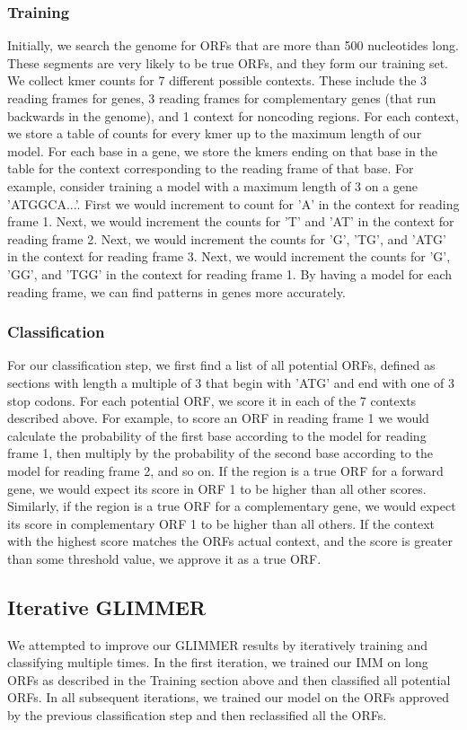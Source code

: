 \documentclass[11pt,letterpaper]{article}
\begin{document}
\subsubsection{Training}
Initially, we search the genome for ORFs that are more than 500 nucleotides long. These segments are very likely to be true ORFs, and they form our training set. We collect kmer counts for 7 different possible contexts. These include the 3 reading frames for genes, 3 reading frames for complementary genes (that run backwards in the genome), and 1 context for noncoding regions. For each context, we store a table of counts for every kmer up to the maximum length of our model. For each base in a gene, we store the kmers ending on that base in the table for the context corresponding to the reading frame of that base. For example, consider training a model with a maximum length of 3 on a gene 'ATGGCA...'. First we would increment to count for 'A' in the context for reading frame 1. Next, we would increment the counts for 'T' and 'AT' in the context for reading frame 2. Next, we would increment the counts for 'G', 'TG', and 'ATG' in the context for reading frame 3. Next, we would increment the counts for 'G', 'GG', and 'TGG' in the context for reading frame 1. By having a model for each reading frame, we can find patterns in genes more accurately.

\subsubsection{Classification}
For our classification step, we first find a list of all potential ORFs, defined as sections with length a multiple of 3 that begin with 'ATG' and end with one of 3 stop codons. For each potential ORF, we score it in each of the 7 contexts described above. For example, to score an ORF in reading frame 1 we would calculate the probability of the first base according to the model for reading frame 1, then multiply by the probability of the second base according to the model for reading frame 2, and so on. If the region is a true ORF for a forward gene, we would expect its score in ORF 1 to be higher than all other scores. Similarly, if the region is a true ORF for a complementary gene, we would expect its score in complementary ORF 1 to be higher than all others. If the context with the highest score matches the ORFs actual context, and the score is greater than some threshold value, we approve it as a true ORF.


\subsection{Iterative GLIMMER}
We attempted to improve our GLIMMER results by iteratively training and classifying multiple times. In the first iteration, we trained our IMM on long ORFs as described in the Training section above and then classified all potential ORFs. In all subsequent iterations, we trained our model on the ORFs approved by the previous classification step and then reclassified all the ORFs.
\end{document}
